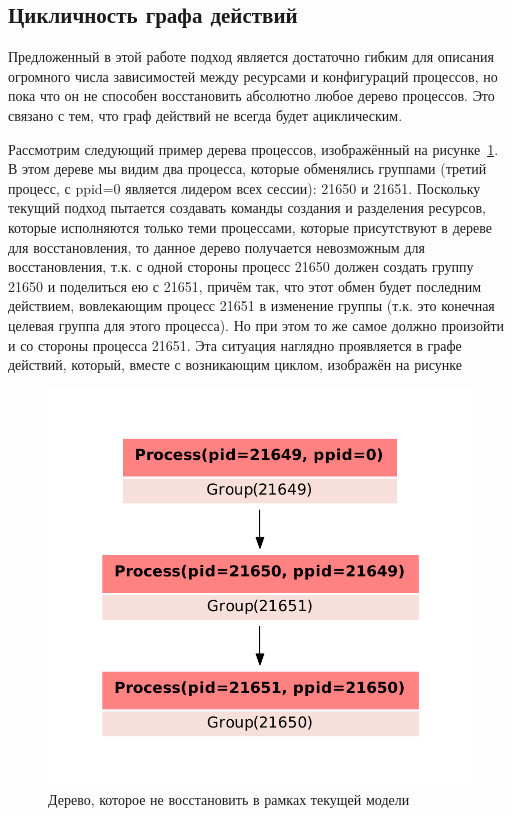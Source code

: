 \subsection{Цикличность графа действий}
\label{chap2:subsec:cycles}

Предложенный в этой работе подход является достаточно гибким для описания огромного числа зависимостей между ресурсами
и конфигураций процессов, но пока что он не способен восстановить абсолютно любое дерево процессов. Это связано с тем, что граф действий не всегда будет ациклическим.

Рассмотрим следующий пример дерева процессов, изображённый на рисунке~\ref{chap2:fig:imppstree}. В этом дереве мы видим
два процесса, которые обменялись группами (третий процесс, с ppid=0 является лидером всех сессии): 21650 и 21651. Поскольку текущий подход пытается создавать команды создания и разделения ресурсов, которые исполняются только теми процессами, которые присутствуют в дереве для восстановления, то данное дерево получается невозможным для восстановления, т.к. с одной стороны процесс 21650 должен создать группу 21650 и поделиться ею с 21651, причём так, что этот обмен будет последним действием, вовлекающим процесс 21651 в изменение группы (т.к. это конечная целевая группа для этого процесса). Но при этом то же самое должно произойти и со стороны процесса 21651. Эта ситуация наглядно проявляется в графе действий, который, вместе с возникающим циклом, изображён на рисунке

\begin{figure}[ht!]
	\centering
	\includegraphics[scale=0.4]{fig/badextree.pdf}
\caption{Дерево, которое не восстановить в рамках текущей модели}
\label{chap2:fig:imppstree}
\end{figure}


